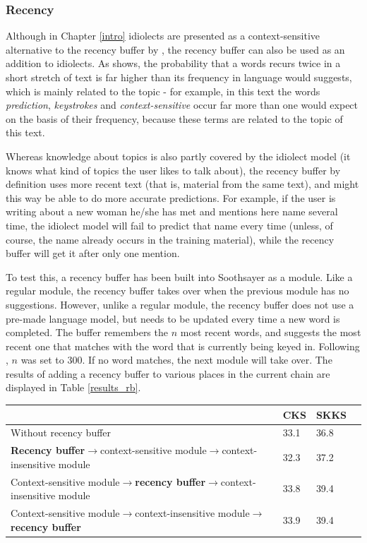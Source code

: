 \documentclass[11pt]{article}
\let\originaltable\table
\let\endoriginaltable\endtable
\renewenvironment{table}[1][ht]{%
  \originaltable[#1]
  \centering}%
  {\endoriginaltable}
\begin{document}
\subsubsection{Recency} \label{rb}

Although in Chapter \ref{intro} idiolects are presented as a context-sensitive alternative to the recency buffer by , the recency buffer can also be used as an addition to idiolects. As  shows, the probability that a words recurs twice in a short stretch of text is far higher than its  frequency in language would suggests, which is mainly related to the topic - for example, in this text the words \emph{prediction}, \emph{keystrokes} and \emph{context-sensitive}  occur far more than one would expect on the basis of their frequency, because these terms are related to the topic of this text. 

Whereas knowledge about topics is also partly covered by the idiolect model (it knows what kind of topics the user likes to talk about), the recency buffer by definition uses more recent text (that is, material from the same text), and might this way be able to do more accurate predictions. For example, if the user is writing about a new woman he/she has met and mentions here name several time, the idiolect model will fail to predict that name every time (unless, of course, the name already occurs in the training material), while the recency buffer will get it after only one mention.

To test this, a recency buffer has been built into Soothsayer as a module. Like a regular module, the recency buffer takes over when the previous module has no suggestions. However, unlike a regular module, the recency buffer does not use a pre-made language model, but needs to be updated every time a new word is completed. The buffer remembers the $n$ most recent words, and suggests the most recent one that matches with the word that is currently being keyed in. Following , $n$ was set to 300. If no word matches, the next module will take over. The results of adding a recency buffer to various places in the current chain are displayed in Table \ref{results_rb}.

\begin{table}[h]
\begin{tabular}{l|lll} 

&CKS&SKKS\\
\hline
Without recency buffer&33.1&36.8\\
\textbf{Recency buffer}$\rightarrow$context-sensitive module$\rightarrow$context-insensitive module&32.3&37.2\\
Context-sensitive module$\rightarrow$\textbf{recency buffer}$\rightarrow$context-insensitive module&33.8&39.4\\
Context-sensitive module$\rightarrow$context-insensitive module$\rightarrow$\textbf{recency buffer}&33.9&39.4\\
\end{tabular} 
\caption{Percentage of keystrokes saved with and without a recency buffer.} \label{results_rb}
\end{table}
\end{document}
